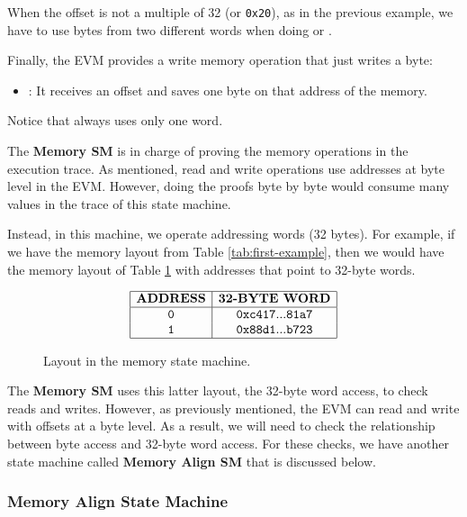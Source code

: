 When the offset is not a multiple of 32 (or \texttt{0x20}), as in the previous example, we have to use bytes from two different words when doing \MLOAD or \MSTORE.

Finally, the EVM provides a write memory operation that just writes a byte:

\begin{itemize}
    
    \item \MSTOREE: It receives an offset and saves one byte on that address of the memory.
    
\end{itemize}

Notice that \MSTOREE always uses only one word.

The \textbf{Memory SM} is in charge of proving the memory operations in the execution trace. As mentioned, read and write operations use addresses at byte level in the EVM. However, doing the proofs byte by byte would consume many values in the trace of this state machine.

Instead, in this machine, we operate addressing words (32 bytes). For example, if we have the memory layout from Table \ref{tab:first-example}, then we would have the memory layout of Table \ref{tab:third-example} with addresses that point to 32-byte words.

\begin{figure}[h!]
    \renewcommand{\figurename}{Table}
    \[
    \begin{array}{|c|c|}
        \hline
        \textbf{ADDRESS} & \textbf{32-BYTE WORD} \\ \hline
        \mathtt{0} &\mathtt{0xc417...81a7} \\
        \mathtt{1} &\mathtt{0x88d1...b723} \\
        \hline
    \end{array}
    \]
    \caption{Layout in the memory state machine.}
    \label{tab:third-example}
\end{figure}

The \textbf{Memory SM} uses this latter layout, the 32-byte word access, to check reads and writes. However, as previously mentioned, the EVM can read and write with offsets at a byte level. As a result, we will need to check the relationship between byte access and 32-byte word access. For these checks, we have another state machine called \textbf{Memory Align SM} that is discussed below.


\subsubsection*{Memory Align State Machine} 



